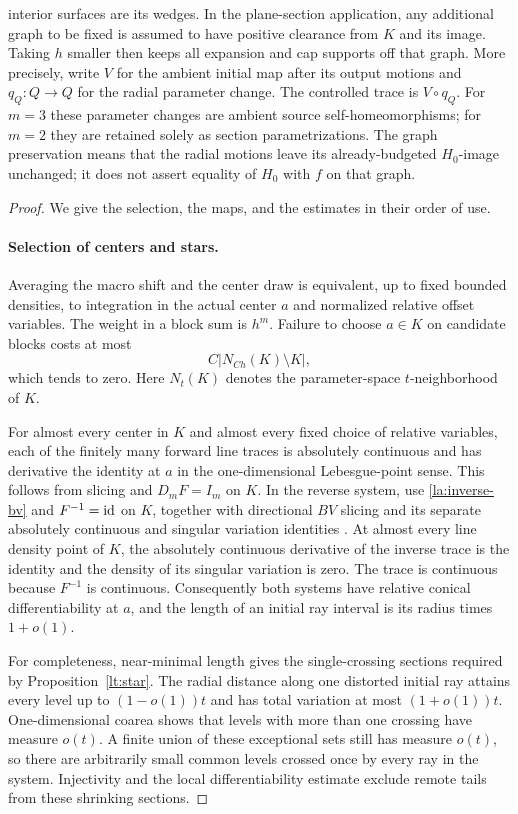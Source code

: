 \begin{lemma}
interior surfaces are its wedges.  In the plane-section application,
any additional graph to be fixed is assumed to have positive
clearance from $K$ and its image.  Taking $h$ smaller then keeps all
expansion and cap supports off that graph.  More precisely, write
$V$ for the ambient initial map after its output motions and
$q_Q:Q\to Q$ for the radial parameter change.  The controlled trace
is $V\circ q_Q$.  For $m=3$ these parameter changes are ambient
source self-homeomorphisms; for $m=2$ they are retained solely as
section parametrizations.  The graph preservation means that the
radial motions leave its already-budgeted $H_0$-image unchanged;
it does not assert equality of $H_0$ with $f$ on that graph.
\end{lemma}

\begin{proof}
We give the selection, the maps, and the estimates in their order of
use.

\paragraph{Selection of centers and stars.}
Averaging the macro shift and the center draw is equivalent, up to
fixed bounded densities, to integration in the actual center $a$ and
normalized relative offset variables.  The weight in a block sum is
$h^m$.  Failure to choose $a\in K$ on candidate blocks costs at most
\[
 C\bigl|N_{Ch}(K)\setminus K\bigr|,
\]
which tends to zero.  Here $N_t(K)$ denotes the parameter-space
$t$-neighborhood of $K$.

For almost every center in $K$ and almost every fixed choice of
relative variables, each of the finitely many forward line traces is
absolutely continuous and has derivative the identity at $a$ in the
one-dimensional Lebesgue-point sense.  This follows from slicing and
$D_mF=I_m$ on $K$.  In the reverse system, use
\eqref{la:inverse-bv} and $F^{-1}=\operatorname{id}$ on $K$, together with directional
$BV$ slicing and its separate absolutely continuous and singular
variation identities
\cite[Section~3.11, Theorems~3.103, 3.107, and~3.108]{AmbrosioFuscoPallara2000}.
At almost every line
density point of $K$, the absolutely continuous derivative of the
inverse trace is the identity and the density of its singular
variation is zero.  The trace is continuous because $F^{-1}$ is
continuous.  Consequently both systems have relative conical
differentiability at $a$, and the length of an initial ray interval is
its radius times $1+o(1)$.

For completeness, near-minimal length gives the single-crossing
sections required by Proposition~\ref{lt:star}.  The radial distance along
one distorted initial ray attains every level up to $(1-o(1))t$ and
has total variation at most $(1+o(1))t$.  One-dimensional coarea shows
that levels with more than one crossing have measure $o(t)$.  A finite
union of these exceptional sets still has measure $o(t)$, so there
are arbitrarily small common levels crossed once by every ray in
the system.  Injectivity and the local differentiability estimate
exclude remote tails from these shrinking sections.


\end{proof}
